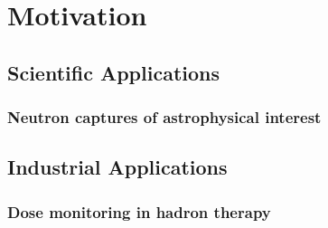 \chapter{Motivation}\label{ch:motivation}

\section{Scientific Applications}

\subsection{Neutron captures of astrophysical interest}

\section{Industrial Applications}

\subsection{Dose monitoring in hadron therapy}

